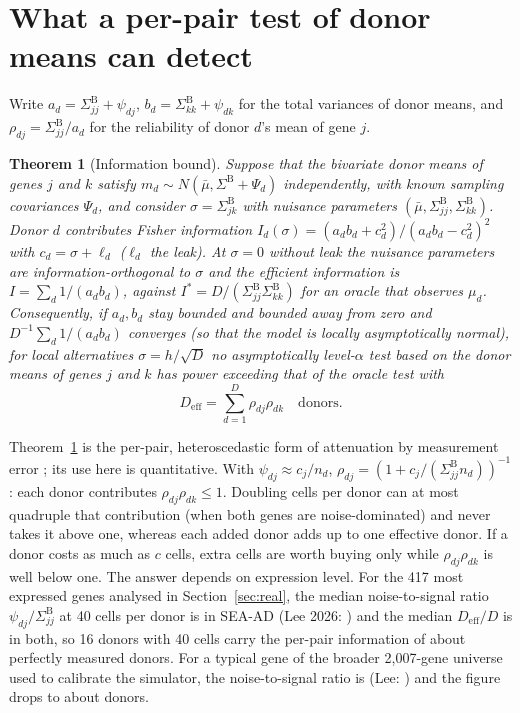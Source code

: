 \documentclass[10pt,letterpaper]{article}
\newtheorem{theorem}{Theorem}
\theoremstyle{definition}
\newcommand{\SB}{\Sigma^{\mathrm{B}}}
\newcommand{\Deff}{D_{\mathrm{eff}}}
\begin{document}
\section{What a per-pair test of donor means can detect}

Write $a_d=\SB_{jj}+\psi_{dj}$, $b_d=\SB_{kk}+\psi_{dk}$ for the total variances of donor means, and $\rho_{dj}=\SB_{jj}/a_d$ for the reliability of donor $d$'s mean of gene $j$.

\begin{theorem}[Information bound]\label{thm:bound}
Suppose that the bivariate donor means of genes $j$ and $k$ satisfy $m_d\sim N(\bar\mu,\SB+\Psi_d)$ independently, with known sampling covariances $\Psi_d$, and consider $\sigma=\SB_{jk}$ with nuisance parameters $(\bar\mu,\SB_{jj},\SB_{kk})$. Donor $d$ contributes Fisher information $I_d(\sigma)=(a_db_d+c_d^2)/(a_db_d-c_d^2)^2$ with $c_d=\sigma+\ell_d$ ($\ell_d$ the leak). At $\sigma=0$ without leak the nuisance parameters are information-orthogonal to $\sigma$ and the efficient information is $I=\sum_d1/(a_db_d)$, against $I^\ast=D/(\SB_{jj}\SB_{kk})$ for an oracle that observes $\mu_d$. Consequently, if $a_d,b_d$ stay bounded and bounded away from zero and $D^{-1}\sum_d1/(a_db_d)$ converges (so that the model is locally asymptotically normal), for local alternatives $\sigma=h/\sqrt D$ no asymptotically level-$\alpha$ test based on the donor means of genes $j$ and $k$ has power exceeding that of the oracle test with
\[
\Deff=\sum_{d=1}^D\rho_{dj}\rho_{dk}\quad\text{donors.}
\]
\end{theorem}
Theorem~\ref{thm:bound} is the per-pair, heteroscedastic form of attenuation by measurement error \citep{Spearman1904,Fuller1987}; its use here is quantitative. With $\psi_{dj}\approx c_j/n_d$, $\rho_{dj}=(1+c_j/(\SB_{jj}n_d))^{-1}$: each donor contributes $\rho_{dj}\rho_{dk}\le1$. Doubling cells per donor can at most quadruple that contribution (when both genes are noise-dominated) and never takes it above one, whereas each added donor adds up to one effective donor. If a donor costs as much as $c$ cells, extra cells are worth buying only while $\rho_{dj}\rho_{dk}$ is well below one. The answer depends on expression level. For the 417 most expressed genes analysed in Section~\ref{sec:real}, the median noise-to-signal ratio $\psi_{dj}/\SB_{jj}$ at 40 cells per donor is \SEAADnsFortyTop{} in SEA-AD (Lee 2026: \LEEnsFortyTop{}) and the median $\Deff/D$ is \DeffCapRange{} in both, so 16 donors with 40 cells carry the per-pair information of about \DeffSixteenTop{} perfectly measured donors. For a typical gene of the broader 2{,}007-gene universe used to calibrate the simulator, the noise-to-signal ratio is \SEAADnsForty{} (Lee: \LEEnsForty{}) and the figure drops to about \DeffSixteenUni{} donors.
\end{document}
